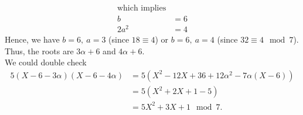 \documentclass{article}
\begin{document}
\begin{homeworkProblem}
\begin{align*}
       \text{which implies}& \\
       b &= 6\\
       2a^2 &= 4
   \end{align*}
   Hence, we have $b=6,\ a=3$ (since $18 \equiv 4$) or $b=6, \ a=4$ (since $32 \equiv 4 \mod 7$).\\
   Thus, the roots are $3 \alpha + 6$ and $4 \alpha + 6$.\\
   We could double check
   \begin{align}
       5(X-6-3 \alpha)(X - 6 - 4 \alpha) &= 5 (X^2 -12X + 36 + 12 \alpha^2 -7 \alpha (X-6))\\
       &= 5(X^2 + 2 X + 1 -5)\\
       &= 5 X^2 + 3X + 1 \mod 7.
   \end{align}
   

   
    
    
    
    



\end{homeworkProblem}
\end{document}
